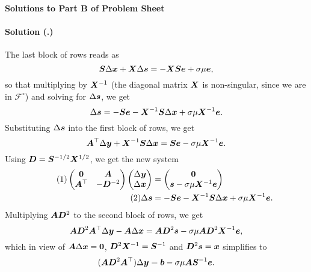 \documentclass{article}
\newcounter{problemSheetNumber}
\newcounter{problems}
\renewcommand{\solution}[1]{\paragraph{Solution (\theproblemSheetNumber.\theproblems)}\addtocounter{problems}{1}\label{#1}}
\begin{document}
 
\begin{center}
{\Large {\bf Solutions to Part B of Problem Sheet \theproblemSheetNumber}}
\end{center}



\solution{} The last block of rows reads as
\begin{equation*}
 \bm{S}\Delta\bm{x}+\bm{X}\Delta\bm{s}=-\bm{XS}\bm{e}+\sigma \mu \bm{e},
\end{equation*}
so that multiplying by $\bm{X}^{-1}$ (the diagonal matrix $\bm{X}$ is non-singular, since we are in $\mathcal{F}^{\circ}$) and solving for $\Delta\bm{s}$, we get
\begin{equation*}
 \Delta \bm{s} = -\bm{S}\bm{e}-\bm{X}^{-1}\bm{S}\Delta\bm{x}+\sigma \mu \bm{X}^{-1}\bm{e}.
\end{equation*}
Substituting $\Delta \bm{s}$ into the first block of rows, we get
\begin{equation*}
 \bm{A}^\top \Delta \bm{y}+\bm{X}^{-1}\bm{S}\Delta\bm{x}=\bm{S}\bm{e}-\sigma \mu \bm{X}^{-1}\bm{e}.
\end{equation*}
Using $\bm{D}=\bm{S}^{-1/2}\bm{X}^{1/2}$, we get the new system
\begin{align}\label{eq:1}\tag{1}
\begin{pmatrix}
  \bm{0} & \bm{A}\\
  \bm{A}^{\top} & -\bm{D}^{-2}
 \end{pmatrix} 
 \begin{pmatrix}
  \Delta \bm{y}\\ \Delta \bm{x}
 \end{pmatrix} &= \begin{pmatrix} \bm{0} \\ 
\bm{s}-\sigma \mu \bm{X}^{-1}\bm{e}
\end{pmatrix}\\
\label{eq:2}\tag{2}
\Delta \bm{s} &= -\bm{S}\bm{e}-\bm{X}^{-1}\bm{S}\Delta\bm{x}+\sigma \mu \bm{X}^{-1}\bm{e}.
\end{align}
Multiplying $\bm{A}\bm{D}^2$ to the second block of rows, we get
\begin{equation*}
 \bm{AD}^2\bm{A}^\top\Delta \bm{y}-\bm{A}\Delta\bm{x} = \bm{A}\bm{D}^2\bm{s}-\sigma\mu\bm{A}\bm{D}^2\bm{X}^{-1}\bm{e},
\end{equation*}
which in view of $\bm{A}\Delta\bm{x}=\bm{0}$, $\bm{D}^{2}\bm{X}^{-1}=\bm{S}^{-1}$ and $\bm{D}^2\bm{s} = \bm{x}$ simplifies to
\begin{equation*}
 (\bm{AD}^2\bm{A}^\top) \Delta \bm{y} = \bm{b}-\sigma\mu\bm{A}\bm{S}^{-1}\bm{e}.
\end{equation*}
\end{document}
